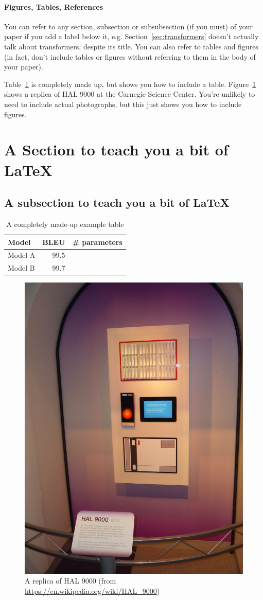 \documentclass[letterpaper, 11pt]{article}
\begin{document}
\paragraph{Figures, Tables, References}
You can refer to any section, subsection or subsubsection (if you must) of your paper if you add a label below it, e.g. Section~\ref{sec:transformers} doesn't actually talk about transformers, despite its title. 
You can also refer to tables and figures (in fact, don't include tables or figures without referring to them in the body of your paper).

Table~\ref{tab:my_label} is completely made up, but shows you how to include a table. 
Figure~\ref{fig:hal} shows a replica of HAL 9000 at the Carnegie Science Center. 
You're unlikely to need to include actual photographs, but this just shows you how to include figures. 

\section{A Section to teach you a bit of \LaTeX}
\label{sec:section}

\subsection{A subsection to teach you a bit of \LaTeX}
\label{sec:subsection} 




\begin{table}[b] %
    \centering
    \begin{tabular}{lrr}
    \toprule
       Model  & BLEU & \# parameters \\ %
         \midrule
Model A  &  99.5 &  \\ 
Model B & 99.7 & \\
         \bottomrule
    \end{tabular}
    \caption{A completely made-up example table}
    \label{tab:my_label}
\end{table}

\begin{figure}[b]
    \centering
    \includegraphics[width=.25\textwidth]{HAL_9000.JPG}
    \caption{A replica of HAL 9000 (from \url{https://en.wikipedia.org/wiki/HAL_9000})}
    \label{fig:hal}
\end{figure}
\end{document}

